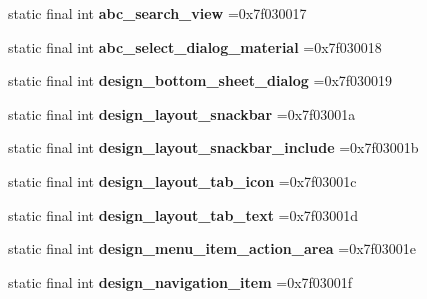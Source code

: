 \begin{DoxyCompactItemize}
static final int {\bfseries abc\+\_\+search\+\_\+view} =0x7f030017
\item 
\mbox{\label{classproject4_1_1xaria_1_1R_1_1layout_aeaa444f3dfff67d55dfa0a59bffc3bc7}} 
static final int {\bfseries abc\+\_\+select\+\_\+dialog\+\_\+material} =0x7f030018
\item 
\mbox{\label{classproject4_1_1xaria_1_1R_1_1layout_a9e8cbe13a8dbbb3e32ae39e6f137a317}} 
static final int {\bfseries design\+\_\+bottom\+\_\+sheet\+\_\+dialog} =0x7f030019
\item 
\mbox{\label{classproject4_1_1xaria_1_1R_1_1layout_a2d8b98de6ade9c5ed813a87c8f0285ad}} 
static final int {\bfseries design\+\_\+layout\+\_\+snackbar} =0x7f03001a
\item 
\mbox{\label{classproject4_1_1xaria_1_1R_1_1layout_adfba7e1cba72d3a3405d0c8b9403c15f}} 
static final int {\bfseries design\+\_\+layout\+\_\+snackbar\+\_\+include} =0x7f03001b
\item 
\mbox{\label{classproject4_1_1xaria_1_1R_1_1layout_acedb86fde31031d8496ecfe725270c73}} 
static final int {\bfseries design\+\_\+layout\+\_\+tab\+\_\+icon} =0x7f03001c
\item 
\mbox{\label{classproject4_1_1xaria_1_1R_1_1layout_a48b837e49bb446b8cd82196bb50c5285}} 
static final int {\bfseries design\+\_\+layout\+\_\+tab\+\_\+text} =0x7f03001d
\item 
\mbox{\label{classproject4_1_1xaria_1_1R_1_1layout_a6d89900bebc1d5bf5c9b8b66f9cc3814}} 
static final int {\bfseries design\+\_\+menu\+\_\+item\+\_\+action\+\_\+area} =0x7f03001e
\item 
\mbox{\label{classproject4_1_1xaria_1_1R_1_1layout_aa29b85e3697c99ca938501c205a189ec}} 
static final int {\bfseries design\+\_\+navigation\+\_\+item} =0x7f03001f
\item 
\mbox{\label{classproject4_1_1xaria_1_1R_1_1layout_a766ecedf88eb5f92d3ef0c7efedf2271}} 

\end{DoxyCompactItemize}
